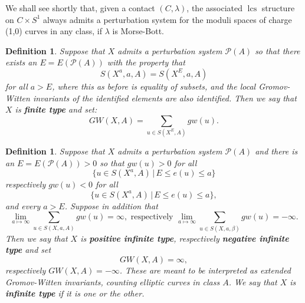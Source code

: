 \documentclass{amsart}
\numberwithin{equation}{section}
\newtheorem{definition}[equation]{Definition}
\theoremstyle{definition}
\theoremstyle{remark}
\DeclareMathOperator{\lcs}{lcs}
\begin{document}
We shall see shortly that, given a contact $(C,\lambda)$, the associated $\lcs$ structure on $C \times S ^{1}$  always admits a perturbation
system for the moduli spaces of charge (1,0) curves in any class, if $\lambda$ is Morse-Bott.
\begin{definition} \label{def:finitetype}  Suppose that  
 $X$ admits a perturbation system $\mathcal{P} (A)$ so that there exists an $E = E (\mathcal{P} (A))$ with the property that $$S  (X
 ^{a}, a, A) = S  (X ^{E}, a, A   )$$ for all $a > E$, where this as
before is equality of subsets, and the
local Gromov-Witten invariants of the identified elements are also identified.
Then we say that $X$ is \textbf{\emph{finite type}} and set:
   \begin{equation*}
      GW (X, A) = \sum _{u \in S   (X ^{E}, A ) }  gw (u).
\end{equation*}


\end {definition}
\begin {definition} \label{def:infinitetype}
Suppose that $X$ admits a perturbation system $\mathcal{P} (A)$ and there is an $E = E (\mathcal{P} (A)) >0$ so that $gw (u)>0$ for all $$\{u \in S(X ^{a}, A) \, | \, E \leq e (u) \leq a \} $$ respectively $gw (u)<0$
for all $$\{u \in S(X ^{a}, A) \, | \, E \leq e (u) \leq a \}, $$
and every $a >E$. Suppose in addition that
\begin{equation*}
\lim _{a \mapsto \infty} \sum _{u \in S (X,a,A)}  gw (u) =  \infty, \text{ respectively } \lim _{a \mapsto \infty} \sum _{u \in S (X,a,\beta)}  gw (u) = - \infty.
\end{equation*}
   Then
   we say that $X$ is \textbf{\emph{positive infinite type}}, respectively \textbf{\emph{negative
   infinite type}} and set $$GW (X, A)  = \infty, $$ respectively
   $ GW  (X, A) = - \infty $. These are meant to be interpreted as extended Gromov-Witten invariants, counting elliptic curves in class $A$.
We say that $X$ is
   \textbf{\emph{infinite type}} if it is one or the other.  
\end{definition}   
\end{document}
